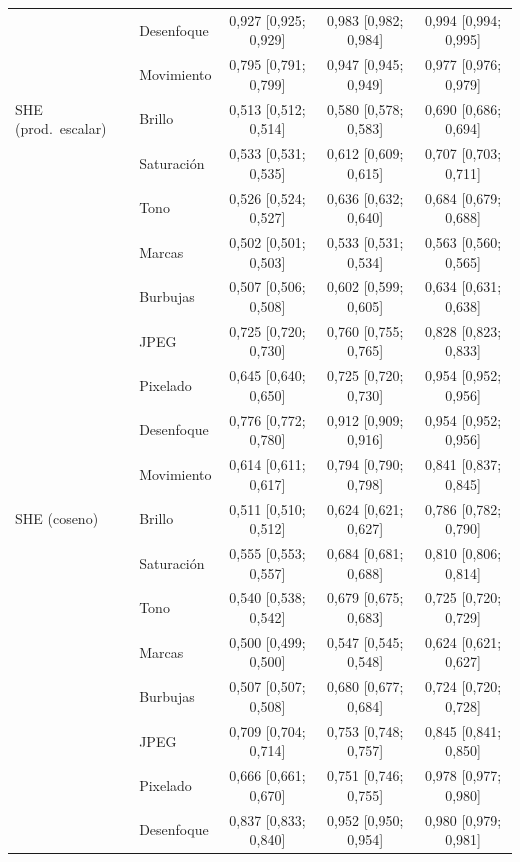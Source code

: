 {\begin{longtable}{llccc}
 & Desenfoque & 0{,}927 [0{,}925; 0{,}929] & 0{,}983 [0{,}982; 0{,}984] & 0{,}994 [0{,}994; 0{,}995] \\
 & Movimiento & 0{,}795 [0{,}791; 0{,}799] & 0{,}947 [0{,}945; 0{,}949] & 0{,}977 [0{,}976; 0{,}979] \\
\midrule
SHE (prod.\ escalar) & Brillo & 0{,}513 [0{,}512; 0{,}514] & 0{,}580 [0{,}578; 0{,}583] & 0{,}690 [0{,}686; 0{,}694] \\
 & Saturación & 0{,}533 [0{,}531; 0{,}535] & 0{,}612 [0{,}609; 0{,}615] & 0{,}707 [0{,}703; 0{,}711] \\
 & Tono & 0{,}526 [0{,}524; 0{,}527] & 0{,}636 [0{,}632; 0{,}640] & 0{,}684 [0{,}679; 0{,}688] \\
 & Marcas & 0{,}502 [0{,}501; 0{,}503] & 0{,}533 [0{,}531; 0{,}534] & 0{,}563 [0{,}560; 0{,}565] \\
 & Burbujas & 0{,}507 [0{,}506; 0{,}508] & 0{,}602 [0{,}599; 0{,}605] & 0{,}634 [0{,}631; 0{,}638] \\
 & JPEG & 0{,}725 [0{,}720; 0{,}730] & 0{,}760 [0{,}755; 0{,}765] & 0{,}828 [0{,}823; 0{,}833] \\
 & Pixelado & 0{,}645 [0{,}640; 0{,}650] & 0{,}725 [0{,}720; 0{,}730] & 0{,}954 [0{,}952; 0{,}956] \\
 & Desenfoque & 0{,}776 [0{,}772; 0{,}780] & 0{,}912 [0{,}909; 0{,}916] & 0{,}954 [0{,}952; 0{,}956] \\
 & Movimiento & 0{,}614 [0{,}611; 0{,}617] & 0{,}794 [0{,}790; 0{,}798] & 0{,}841 [0{,}837; 0{,}845] \\
\midrule
SHE (coseno) & Brillo & 0{,}511 [0{,}510; 0{,}512] & 0{,}624 [0{,}621; 0{,}627] & 0{,}786 [0{,}782; 0{,}790] \\
 & Saturación & 0{,}555 [0{,}553; 0{,}557] & 0{,}684 [0{,}681; 0{,}688] & 0{,}810 [0{,}806; 0{,}814] \\
 & Tono & 0{,}540 [0{,}538; 0{,}542] & 0{,}679 [0{,}675; 0{,}683] & 0{,}725 [0{,}720; 0{,}729] \\
 & Marcas & 0{,}500 [0{,}499; 0{,}500] & 0{,}547 [0{,}545; 0{,}548] & 0{,}624 [0{,}621; 0{,}627] \\
 & Burbujas & 0{,}507 [0{,}507; 0{,}508] & 0{,}680 [0{,}677; 0{,}684] & 0{,}724 [0{,}720; 0{,}728] \\
 & JPEG & 0{,}709 [0{,}704; 0{,}714] & 0{,}753 [0{,}748; 0{,}757] & 0{,}845 [0{,}841; 0{,}850] \\
 & Pixelado & 0{,}666 [0{,}661; 0{,}670] & 0{,}751 [0{,}746; 0{,}755] & 0{,}978 [0{,}977; 0{,}980] \\
 & Desenfoque & 0{,}837 [0{,}833; 0{,}840] & 0{,}952 [0{,}950; 0{,}954] & 0{,}980 [0{,}979; 0{,}981] \\

\end{longtable}}

